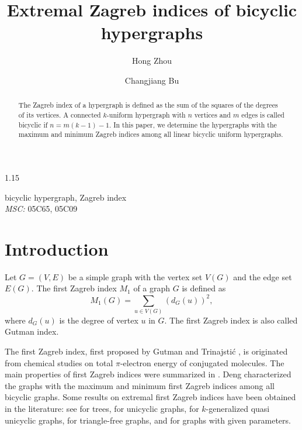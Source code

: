 \documentclass[preprint,12pt]{elsarticle1}
\numberwithin{equation}{section}
\begin{document}
\begin{spacing}{1.15}
\begin{frontmatter}
\title{Extremal Zagreb indices of bicyclic hypergraphs}

\author{Hong Zhou}
\author{Changjiang Bu}
\address{School of Mathematical Sciences, Harbin Engineering University, Harbin 150001, PR China}

\begin{abstract}

The Zagreb index of a hypergraph is defined as the sum of the squares of the degrees of its vertices.
A connected $k$-uniform hypergraph with $n$ vertices and $m$ edges is called bicyclic if $n=m(k-1)-1$.
In this paper, we determine the hypergraphs with the maximum and minimum Zagreb indices among all linear bicyclic uniform hypergraphs.

\end{abstract}


\begin{keyword}
bicyclic hypergraph, Zagreb index\\
\emph{MSC:}
05C65, 05C09
\end{keyword}
\end{frontmatter}



\section{Introduction}

Let $G=(V,E)$ be a simple graph with the vertex set $V(G)$ and the edge set $E(G)$.
The first Zagreb index $M_{1}$ of a graph $G$ is defined as
$$
M_{1}(G)=\sum\limits_{u\in V(G)}(d_{G}(u))^{2},
$$
where $d_{G}(u)$ is the degree of vertex $u$ in $G$. The first Zagreb index is also called Gutman index.


The first Zagreb index, first proposed by Gutman and Trinajsti{\'c} \cite{1972Graph}, is originated
from chemical studies on total $\pi$-electron energy of conjugated molecules.
The main properties of first Zagreb indices were summarized in \cite{30years,2004Graph}.
Deng \cite{Aunifiedapproach} characterized the graphs with the maximum and minimum first Zagreb indices among all bicyclic graphs.
Some results on extremal first Zagreb indices have been obtained in the literature:
see \cite{2004Graph,treedegree,treesdomination,treesdistancedomination} for trees, \cite{Uncyclicgraphswiththefirstthree,orderUncyclicgraphs} for unicyclic graphs,
\cite{Zagrebindicesquasiunicyclic}  for $k$-generalized quasi unicyclic graphs,
\cite{Zagrebindices} for triangle-free graphs, and \cite{Zagrebindicescut,Zagrebindicescutedges,Zagrebindicesclique,Zagrebindicesconnectivity,Zagrebindicespendent} for graphs with given parameters.





\end{spacing}
\end{document}
